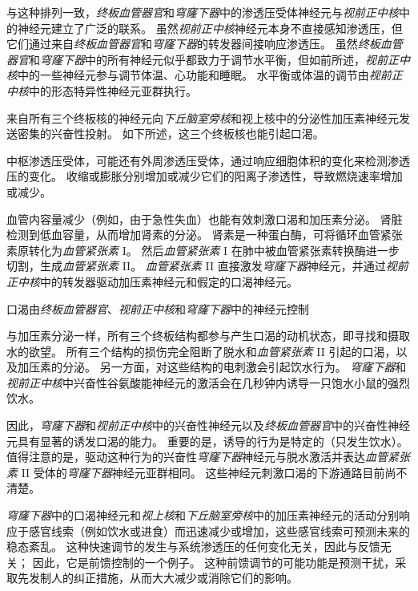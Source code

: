 与这种排列一致，\textit{终板血管器官}和\textit{穹窿下器}中的渗透压受体神经元与\textit{视前正中核}中的神经元建立了广泛的联系。
虽然\textit{视前正中核}神经元本身不直接感知渗透压，但它们通过来自\textit{终板血管器官}和\textit{穹窿下器}的转发器间接响应渗透压。
虽然\textit{终板血管器官}和\textit{穹窿下器}中的所有神经元似乎都致力于调节水平衡，但如前所述，\textit{视前正中核}中的一些神经元参与调节体温、心功能和睡眠。
水平衡或体温的调节由\textit{视前正中核}中的形态特异性神经元亚群执行。


来自所有三个终板核的神经元向\textit{下丘脑室旁核}和视上核中的分泌性加压素神经元发送密集的兴奋性投射。
如下所述，这三个终板核也能引起口渴。


中枢渗透压受体，可能还有外周渗透压受体，通过响应细胞体积的变化来检测渗透压的变化。
收缩或膨胀分别增加或减少它们的阳离子渗透性，导致燃烧速率增加或减少。


血管内容量减少（例如，由于急性失血）也能有效刺激口渴和加压素分泌。
肾脏检测到低血容量，从而增加肾素的分泌。
肾素是一种蛋白酶，可将循环血管紧张素原转化为\textit{血管紧张素} I。
然后\textit{血管紧张素} I 在肺中被血管紧张素转换酶进一步切割，生成\textit{血管紧张素} II。
\textit{血管紧张素} II 直接激发\textit{穹窿下器}神经元，并通过\textit{视前正中核}中的转发器驱动加压素神经元和假定的口渴神经元。


口渴由\textit{终板血管器官}、\textit{视前正中核}和\textit{穹窿下器}中的神经元控制

与加压素分泌一样，所有三个终板结构都参与产生口渴的动机状态，即寻找和摄取水的欲望。
所有三个结构的损伤完全阻断了脱水和\textit{血管紧张素} II 引起的口渴，以及加压素的分泌。
另一方面，对这些结构的电刺激会引起饮水行为。
\textit{穹窿下器}和\textit{视前正中核}中兴奋性谷氨酸能神经元的激活会在几秒钟内诱导一只饱水小鼠的强烈饮水。


因此，\textit{穹窿下器}和\textit{视前正中核}中的兴奋性神经元以及\textit{终板血管器官}中的兴奋性神经元具有显著的诱发口渴的能力。
重要的是，诱导的行为是特定的（只发生饮水）。
值得注意的是，驱动这种行为的兴奋性\textit{穹窿下器}神经元与脱水激活并表达\textit{血管紧张素} II 受体的\textit{穹窿下器}神经元亚群相同。
这些神经元刺激口渴的下游通路目前尚不清楚。


\textit{穹窿下器}中的口渴神经元和\textit{视上核}和\textit{下丘脑室旁核}中的加压素神经元的活动分别响应于感官线索（例如饮水或进食）而迅速减少或增加，这些感官线索可预测未来的稳态紊乱。
这种快速调节的发生与系统渗透压的任何变化无关，因此与反馈无关；
因此，它是前馈控制的一个例子。
这种前馈调节的可能功能是预测干扰，采取先发制人的纠正措施，从而大大减少或消除它们的影响。


